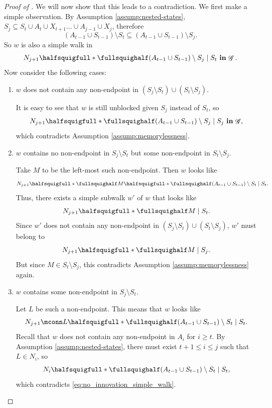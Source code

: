 \documentclass[12pt,a4paper]{article}
\theoremstyle{definition}
\newcommand{\ingraph}[1]{~\textnormal{\bf in}\,#1}
\DeclareMathOperator{\gG}{\mathscr{G}}
\begin{document}
\begin{proof}[Proof of
  ]
  We will now show that this leads to a contradiction. We first make a simple observation. By
  Assumption \ref{assump:nested-states}, $S_{j} \subseteq S_{t} \cup A_{t} \cup X_{t+1}  \dots \cup A_{j-1} \cup X_{j}$, therefore
  \[
      (A_{t-1} \cup S_{t-1}) \setminus S_{t} \subseteq (A_{t-1} \cup
      S_{t-1}) \setminus S_j.
  \]
  So $w$ is also a simple walk in
  \[
      N_{j+1} \halfsquigfull \ast \fullsquighalf (A_{t-1} \cup S_{t-1}) \setminus S_{j} \mid S_t \ingraph{\gG}.
    \]
    Now consider the following cases:
  \begin{enumerate}
    \item  $w$ does not contain any non-endpoint in $(S_j \setminus S_t) \cup (S_t \setminus S_j)$.

    It is easy to see that $w$ is still unblocked given $S_j$ instead of $S_t$, so
    \begin{align*}\label{eq:innovation_simple_walk_Sj}
        N_{j+1} \halfsquigfull \ast \fullsquighalf (A_{t-1} \cup
      S_{t-1}) \setminus S_{j} \mid S_j \ingraph{\gG},
    \end{align*}
    which contradicts Assumption \ref{assump:memorylessness}.

    \item $w$ contains no non-endpoint in $S_j \setminus S_t$ but some non-endpoint in $S_t \setminus S_j$.

    Take $M$ to be the left-most such non-endpoint. Then $w$ looks like
    \[
        N_{j+1}  \halfsquigfull \ast \fullsquighalf M
        \halfsquigfull \ast \fullsquighalf (A_{t-1} \cup S_{t-1})
        \setminus S_{t} \mid S_{t}.
    \]
    Thus, there exists a simple subwalk $w'$ of $w$ that looks like
    \[
        N_{j+1}  \halfsquigfull \ast \fullsquighalf M \mid S_{t}.
    \]
    Since $w'$ does not contain any non-endpoint in $(S_j \setminus S_t) \cup (S_t \setminus S_j)$, $w'$ must belong to
    \[
        N_{j+1}  \halfsquigfull \ast \fullsquighalf M \mid S_{j}.
    \]
    But since $M \in S_t \setminus S_j$, this contradicts Assumption \ref{assump:memorylessness} again.

    \item $w$ contains some non-endpoint in $S_j \setminus S_t$.

    Let $L$ be such a non-endpoint. This means that $w$ looks like
    \[
        N_{j+1}  \mconn L \halfsquigfull \ast \fullsquighalf (A_{t-1} \cup S_{t-1}) \setminus S_{t} \mid S_{t}.
      \]
    Recall that $w$ does not contain any non-endpoint in $A_i$ for $i \geq t$. By Assumption \ref{assump:nested-states}, there must exist $t+1 \leq i \leq j$ such that $L \in N_i$, so
    \[
        N_{i} \halfsquigfull \ast \fullsquighalf (A_{t-1} \cup S_{t-1}) \setminus S_{t} \mid S_{t},
    \]
    which contradicts \eqref{eq:no_innovation_simple_walk}.
  \end{enumerate}
\end{proof}
\end{document}
